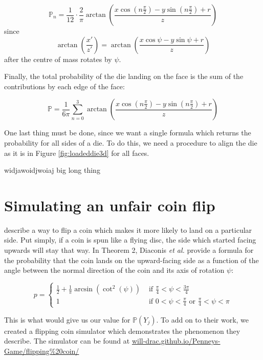 \documentclass[english,12pt,a4paper,final]{article}
\begin{document}
\begin{equation*}
	\mathbb{P}_n = \frac{1}{12} \cdot \frac{2}{\pi} \arctan\left(\frac{x\cos(n\frac{\pi}{2})-y\sin(n\frac{\pi}{2})+r}{z}\right)
\end{equation*}
since
\begin{equation*}
	\arctan\left(\frac{x'}{z'}\right) = \arctan\left(\frac{x\cos\psi-y\sin\psi+r}{z}\right)
\end{equation*}
after the centre of mass rotates by $\psi$.

Finally, the total probability of the die landing on the face is the sum of the contributions by each edge of the face:

\begin{equation*}
	\mathbb{P} = \frac{1}{6\pi} \sum_{n=0}^{3} \arctan\left(\frac{x\cos(n\frac{\pi}{2})-y\sin(n\frac{\pi}{2})+r}{z}\right)
\end{equation*}

One last thing must be done, since we want a single formula which returns the probability for all sides of a die. To do this, we need a procedure to align the die as it is in Figure \ref{fig:loadeddie3d} for all faces.

widjawoidjwoiaj big long thing

\section{Simulating an unfair coin flip}

\textcite{unfairCoin} describe a way to flip a coin which makes it more likely to land on a particular side. Put simply, if a coin is spun like a flying disc, the side which started facing upwards will stay that way. In Theorem 2, Diaconis \textit{et al.} provide a formula for the probability that the coin lands on the upward-facing side as a function of the angle between the normal direction of the coin and its axis of rotation $\psi$:

\begin{equation}\label{coinProbByAngle}
	p = \begin{cases}
		\frac{1}{2} + \frac{1}{\pi}\arcsin(\cot^2(\psi)) & \text{ if } \frac{\pi}{4}<\psi<\frac{3\pi}{4}
		\\
		1 & \text{ if } 0<\psi<\frac{\pi}{4} \text{ or } \frac{\pi}{4} < \psi < \pi
	\end{cases}
\end{equation}

This is what would give us our value for $\mathbb{P}(Y_j)$. To add on to their work, we created a flipping coin simulator which demonstrates the phenomenon they describe. The simulator can be found at \href{https://will-drac.github.io/Penneys-Game/flipping%20coin/}{will-drac.github.io/Penneys-Game/flipping\%20coin/}
\end{document}
